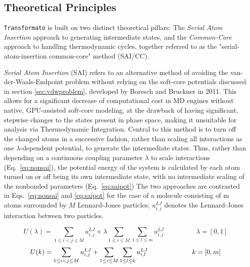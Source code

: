 \documentclass[oneside]{scrreprt}
\begin{document}
\subsection{Theoretical Principles} \label{sec:tf_principles}
\texttt{Transformato} is built on two distinct theoretical pillars: The \emph{Serial Atom Insertion} approach to generating intermediate states, and the \emph{Common-Core} approach to handling thermodynamic cycles, together referred to as the "serial-atom-insertion common-core" method (SAI/CC).

\emph{Serial Atom Insertion} (SAI)\cite{boresch_avoiding_2011} refers to an alternative method of avoiding the van-der-Waals-Endpoint problem without relying on the soft-core potentials discussed in section \ref{sec:vdwproblem}, developed by Boresch and Bruckner in 2011. This allows for a significant decrease of computational cost in MD engines without native, GPU-assisted soft-core modeling, at the drawback of having significant, stepwise changes to the states present in phase space, making it unsuitable for analysis via Thermodynamic Integration. Central to this method is to turn off the changed atoms in a successive fashion, rather than scaling all interactions as one $\lambda$-dependent potential, to generate the intermediate states. Thus, rather than depending on a continuous coupling parameter $\lambda$ to scale interactions (Eq.~\ref{eq:nonsai}),
the  potential energy of the system is calculated by  each atom turned on or off being its own intermediate state, with no intermediate scaling of the nonbonded parameters (Eq.~\ref{eq:saipot})
The two approaches are contrasted in Eqs.~\ref{eq:nonsai} and \ref{eq:saipot} for the case of a molecule consisting of m atoms surrounded by $M$ Lennard-Jones particles; $u^{LJ}_{i,j}$ denotes the Lennard-Jones interaction between two particles.

\begin{equation}\label{eq:nonsai}
    U(\lambda)=\sum_{1\leq i<j \leq M} u^{LJ}_{i,j}+\lambda \sum_{1 \leq i \leq M} \sum_{1 \leq l \leq m} u^{LJ}_{i,j} \hspace{2cm} \lambda=[0,1]
\end{equation}
\begin{equation}\label{eq:saipot}
    U(k)=\sum_{1\leq i<j \leq M} u^{LJ}_{i,j}+\sum_{1 \leq i \leq M} \sum_{1 \leq l \leq k} u^{LJ}_{i,l} \hspace{2.3cm} k=[0,m]
\end{equation}
\end{document}
